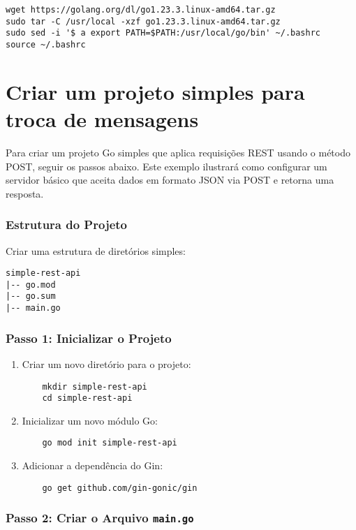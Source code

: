\begin{verbatim}
wget https://golang.org/dl/go1.23.3.linux-amd64.tar.gz
sudo tar -C /usr/local -xzf go1.23.3.linux-amd64.tar.gz
sudo sed -i '$ a export PATH=$PATH:/usr/local/go/bin' ~/.bashrc
source ~/.bashrc
\end{verbatim}

\section{Criar um projeto simples para troca de mensagens}

Para criar um projeto Go simples que aplica requisições REST usando o método POST, seguir os passos abaixo. Este exemplo ilustrará como configurar um servidor básico que aceita dados em formato JSON via POST e retorna uma resposta.

\subsubsection{Estrutura do Projeto}
Criar uma estrutura de diretórios simples:

\begin{verbatim}
simple-rest-api
|-- go.mod
|-- go.sum
|-- main.go
\end{verbatim}

\subsubsection{Passo 1: Inicializar o Projeto}

\begin{enumerate}
    \item Criar um novo diretório para o projeto:
    \begin{verbatim}
    mkdir simple-rest-api
    cd simple-rest-api
    \end{verbatim}

    \item Inicializar um novo módulo Go:
    \begin{verbatim}
    go mod init simple-rest-api
    \end{verbatim}

    \item Adicionar a dependência do Gin:
    \begin{verbatim}
    go get github.com/gin-gonic/gin
    \end{verbatim}
\end{enumerate}

\subsubsection{Passo 2: Criar o Arquivo \texttt{main.go}}

